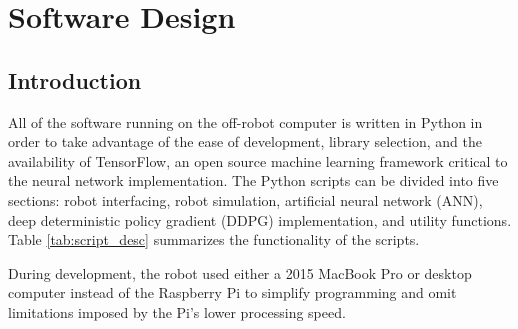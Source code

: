 \chapter{Software Design}
\section{Introduction}
All of the software running on the off-robot computer is written in Python in order to take advantage of the ease of development, library selection, and the availability of TensorFlow, an open source machine learning framework critical to the neural network implementation. The Python scripts can be divided into five sections: robot interfacing, robot simulation, artificial neural network (ANN), deep deterministic policy gradient (DDPG) implementation, and utility functions. Table \ref{tab:script_desc} summarizes the functionality of the scripts.

During development, the robot used either a 2015 MacBook Pro or desktop computer instead of the Raspberry Pi to simplify programming and omit limitations imposed by the Pi's lower processing speed.




